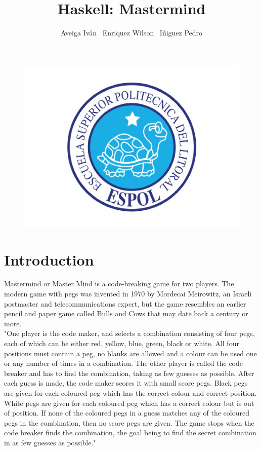 \documentclass[a4paper,11pt]{book}
\begin{document}
\author{
	Aveiga Iván \ Enriquez Wilson \ Iñiguez Pedro
}
\title{Haskell: Mastermind}
\maketitle
\begin{figure}[h]
\centering
\includegraphics[width=0.7\linewidth]{./logo}
\end{figure}

\newpage

\section{Introduction}
Mastermind or Master Mind is a code-breaking game for two players. The modern game with pegs was invented in 1970 by Mordecai Meirowitz, an Israeli postmaster and telecommunications expert, but the game resembles an earlier pencil and paper game called Bulls and Cows that may date back a century or more. \\

"One player is the code maker, and selects a combination consisting of four pegs, each of which can be either red, yellow, blue, green, black or white. All four positions must contain a peg, no blanks are allowed and a colour can be used one or any number of times in a combination. The other player is called the code breaker and has to find
the combination, taking as few guesses as possible. After each guess is made, the code maker scores it
with small score pegs. Black pegs are given for each coloured peg which has the correct colour and correct
position. White pegs are given for each coloured peg which has a correct colour but is out of position. If
none of the coloured pegs in a guess matches any of the coloured pegs in the combination, then no score
pegs are given. The game stops when the code breaker finds the combination, the goal being to find
the secret combination in as few guesses as possible."
\end{document}
